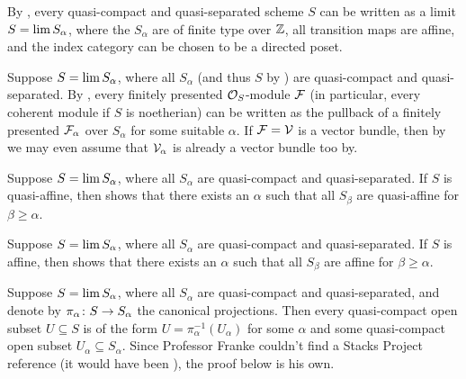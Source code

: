 \begin{alphanumerate}\setcounter{enumi}{3}
	\item By , every quasi-compact and quasi-separated scheme $S$ can be written as a limit $S=\operatorname*{lim} S_\alpha$, where the $S_\alpha$ are of finite type over $\mathbb{Z}$, all transition maps are affine, and the index category can be chosen to be a directed poset.
	\item Suppose $S=\operatorname*{lim} S_\alpha$, where all $S_\alpha$ (and thus $S$ by ) are quasi-compact and quasi-separated. By , every finitely presented $\mathcal{O}_S$-module $\mathcal{F}$ (in particular, every coherent module if $S$ is noetherian) can be written as the pullback of a finitely presented $\mathcal{F}_\alpha$ over $S_\alpha$ for some suitable $\alpha$. If $\mathcal{F}=\mathcal{V}$ is a vector bundle, then by  we may even assume that $\mathcal{V}_\alpha$ is already a vector bundle too by.
	\item Suppose $S=\operatorname*{lim} S_\alpha$, where all $S_\alpha$ are quasi-compact and quasi-separated. If $S$ is quasi-affine, then  shows that there exists an $\alpha$ such that all $S_\beta$ are quasi-affine for $\beta\geq \alpha$.
	\item Suppose $S=\operatorname*{lim} S_\alpha$, where all $S_\alpha$ are quasi-compact and quasi-separated. If $S$ is affine, then  shows that there exists an $\alpha$ such that all $S_\beta$ are affine for $\beta\geq \alpha$.
	\item Suppose $S=\operatorname*{lim} S_\alpha$, where all $S_\alpha$ are quasi-compact and quasi-separated, and denote by $\pi_\alpha\colon S\morphism S_\alpha$ the canonical projections. Then every quasi-compact open subset $U\subseteq S$ is of the form $U=\pi_\alpha^{-1}(U_\alpha)$ for some $\alpha$ and some quasi-compact open subset $U_\alpha\subseteq S_\alpha$. Since Professor Franke couldn't find a Stacks Project reference (it would have been ), the proof below is his own.
\end{alphanumerate}
